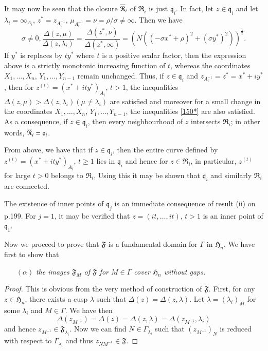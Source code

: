 It may now be seen that the closure $\overline{\mathfrak{R}}_{i}$ of
$\mathfrak{R}_{i}$ is just $\mathfrak{q}_{i}$. In fact, let $z\in
\mathfrak{q}_{i}$ and let $\lambda_{i}=\infty_{A_{i}}$,
$z^{\ast}=z_{A^{-1}_{i}}$, $\mu_{A^{-1}_{i}}=\nu=\rho/\sigma\neq
\infty$. Then we have
$$
\sigma\neq 0,
\frac{\Delta(z,\mu)}{\Delta(z,\lambda_{i})}=\frac{\Delta(z^{\ast},\nu)}{\Delta(z^{\ast},\infty)}=(N((-\sigma
x^{\ast}+\rho)^{2}+(\sigma y^{\ast})^{2}))^{\frac{1}{2}}.
$$
If $y^{\ast}$ is replaces by $ty^{\ast}$ where $t$ is a positive
scalar factor, then the expression above is a strictly monotonic
increasing function of $t$, whereas the coordinates
$X_{1},\ldots,X_{n}$, $Y_{1},\ldots,Y_{n-1}$ remain unchanged. Thus,
if $z\in\mathfrak{q}_{i}$ and
$z_{A^{-1}_{i}}=z^{\ast}=x^{\ast}+iy^{\ast}$, then for
$z^{(t)}=(x^{\ast}+ity^{\ast})_{A_{i}}$, $t>1$, the inequalities
$\Delta(z,\mu)>\Delta(z,\lambda_{i})(\mu\neq \lambda_{i})$ are
satisfied and moreover for a small change in the coordinates
$X_{1},\ldots,X_{n}$, $Y_{1},\ldots,Y_{n-1}$, the inequalities
\eqref{150*} are also satisfied. As a consequence, if
$z\in\mathfrak{q}_{i}$, then every neighbourhood of $z$ intersects
$\mathfrak{R}_{i}$; in other words,
$\overline{\mathfrak{R}}_{i}=\mathfrak{q}_{i}$.

From above, we have that if $z\in \mathfrak{q}_{i}$, then the entire
curve defined by $z^{(t)}=(x^{\ast}+ity^{\ast})_{A_{i}}$, $t\geq 1$
lies in $\mathfrak{q}_{i}$ and hence for $z\in\mathfrak{R}_{i}$, in
particular, $z^{(t)}$ for large $t>0$ belongs to $\mathfrak{R}_{i}$,
Using this it may be shown that $\mathfrak{q}_{i}$ and similarly
$\mathfrak{R}_{i}$ are connected.

The existence of inner points of $\mathfrak{q}_{j}$ is an immediate
consequence of result (ii) on p.\@ 199. For $j=1$, it may be verified
that $z=(it,\ldots,it)$, $t>1$ is an inner point of
$\mathfrak{q}_{1}$.

Now we proceed to prove that $\mathfrak{F}$ is a fundamental domain
for $\Gamma$ in $\mathfrak{H}_{n}$. We have first to show that
\begin{itemize}
\item[$(\alpha)$] {\em the images $\mathfrak{F}_{M}$ of $\mathfrak{F}$
  for $M\in\Gamma$ cover $\mathfrak{H}_{n}$ without gaps.}
\end{itemize}

\begin{proof}
This is obvious from the very method of construction of
$\mathfrak{F}$. First, for any $z\in\mathfrak{H}_{n}$, there exists a
cusp $\lambda$ such that $\Delta(z)=\Delta(z,\lambda)$. Let
$\lambda=(\lambda_{i})_{M}$ for some $\lambda_{i}$ and
$M\in\Gamma$. We have then
$$
\Delta(z_{M^{-1}})=\Delta(z)=\Delta(z,\lambda)=\Delta(z_{M^{-1}},\lambda_{i})
$$\pageoriginale
and hence $z_{M^{-1}}\in\mathfrak{F}_{\lambda_{i}}$. Now we can find
$N\in\Gamma_{\lambda_{i}}$ such that $(z_{M^{-1}})_{N}$ is reduced
with respect to $\Gamma_{\lambda_{i}}$ and thus
$z_{NM^{-1}}\in\mathfrak{F}$.
\end{proof}

